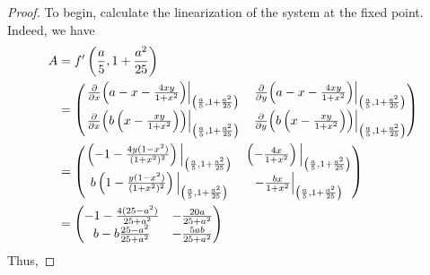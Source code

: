 \documentclass[../psets.tex]{subfiles}
\begin{document}
\begin{enumerate}
\begin{enumerate}
        \begin{proof}
            To begin, calculate the linearization of the system at the fixed point. Indeed, we have
            \begin{align*}
                A &= f'\left( \frac{a}{5},1+\frac{a^2}{25} \right)\\
                &=
                \begin{pmatrix}
                    \eval{\pdv{x}(a-x-\frac{4xy}{1+x^2})}_{\left( \frac{a}{5},1+\frac{a^2}{25} \right)} & \eval{\pdv{y}(a-x-\frac{4xy}{1+x^2})}_{\left( \frac{a}{5},1+\frac{a^2}{25} \right)}\\
                    \eval{\pdv{x}(b\left( x-\frac{xy}{1+x^2} \right))}_{\left( \frac{a}{5},1+\frac{a^2}{25} \right)} & \eval{\pdv{y}(b\left( x-\frac{xy}{1+x^2} \right))}_{\left( \frac{a}{5},1+\frac{a^2}{25} \right)}\\
                \end{pmatrix}\\
                &=
                \begin{pmatrix}
                    \eval{\left( -1-\frac{4y(1-x^2)}{(1+x^2)^2} \right)}_{\left( \frac{a}{5},1+\frac{a^2}{25} \right)} & \eval{\left( -\frac{4x}{1+x^2} \right)}_{\left( \frac{a}{5},1+\frac{a^2}{25} \right)}\\
                    \eval{b\left( 1-\frac{y(1-x^2)}{(1+x^2)^2} \right)}_{\left( \frac{a}{5},1+\frac{a^2}{25} \right)} & \eval{-\frac{bx}{1+x^2}}_{\left( \frac{a}{5},1+\frac{a^2}{25} \right)}\\
                \end{pmatrix}\\
                &=
                \begin{pmatrix}
                    -1-\frac{4(25-a^2)}{25+a^2} & -\frac{20a}{25+a^2}\\
                    b-b\frac{25-a^2}{25+a^2} & -\frac{5ab}{25+a^2}\\
                \end{pmatrix}
            \end{align*}
            Thus,

\end{proof}
\end{enumerate}
\end{enumerate}
\end{document}
